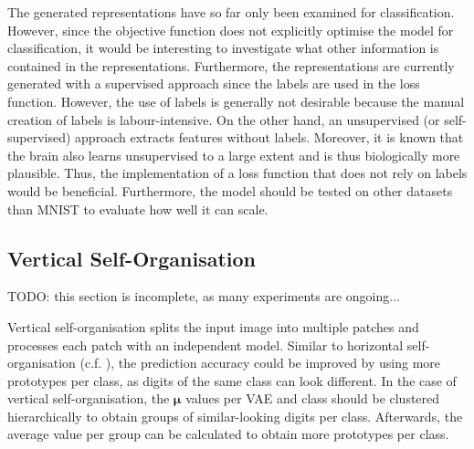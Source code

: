 The generated representations have so far only been examined for classification. However, since the objective function does not explicitly optimise the model for classification, it would be interesting to investigate what other information is contained in the representations. Furthermore, the representations are currently generated with a supervised approach since the labels are used in the loss function. However, the use of labels is generally not desirable because the manual creation of labels is labour-intensive. On the other hand, an unsupervised (or self-supervised) approach extracts features without labels. Moreover, it is known that the brain also learns unsupervised to a large extent and is thus biologically more plausible.
Thus, the implementation of a loss function that does not rely on labels would be beneficial. Furthermore, the model should be tested on other datasets than MNIST to evaluate how well it can scale.




\subsection{Vertical Self-Organisation}
TODO: this section is incomplete, as many experiments are ongoing...

Vertical self-organisation splits the input image into multiple patches and processes each patch with an independent model.
Similar to horizontal self-organisation (c.f. ), the prediction accuracy could be improved by using more prototypes per class, as digits of the same class can look different. In the case of vertical self-organisation, the $\boldsymbol{\mu}$ values per VAE and class should be clustered hierarchically to obtain groups of similar-looking digits per class. Afterwards, the average value per group can be calculated to obtain more prototypes per class.

